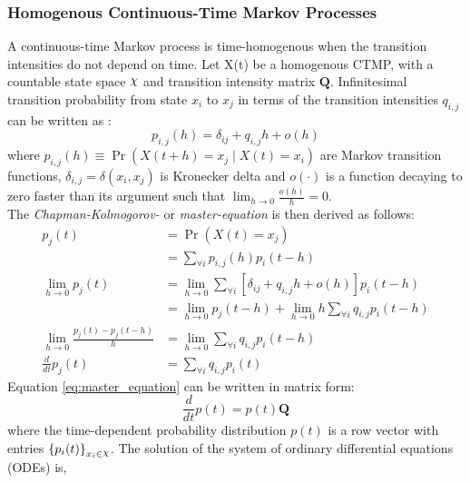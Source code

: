 \subsubsection{Homogenous Continuous-Time Markov Processes}
A continuous-time Markov process is time-homogenous when the transition intensities do not depend on time. Let X(t) be a homogenous CTMP, with a countable state space $ \rchi $ and transition intensity matrix $ \textbf{Q} $. Infinitesimal transition probability from state $ x_{i} $ to $ x_{j} $ in terms of the transition intensities $ q_{i,j} $ can be written as \cite{Cohn2010a}:
\begin{equation}
p_{i,j}(h)=\delta_{ij}+q_{i,j} h+o(h)
\label{eq:Markov_trans_func}
\end{equation}
where $ p_{i, j}(h) \equiv \operatorname{Pr}(X(t+h)=x_j\mid X(t)=x_i) $ are Markov transition functions, $ \delta_{i,j} = \delta(x_i,x_j)$ is Kronecker delta and $ o(\cdot) $ is a function decaying to zero faster than its argument such that $ \lim_{h \to 0} \frac{o(h)}{h} = 0 $.\\
The \textit{Chapman-Kolmogorov-} or \textit{master-equation} is then derived as follows:
\begin{align}
	p_{j}(t) &= \operatorname{Pr}(X(t) = x_{j}) \nonumber\\
		& =\sum_{\forall i} p_{i, j}(h) p_{i}(t-h) \nonumber \\
	\lim_{h\rightarrow 0} p_{j}(t) 
		& = \lim_{h\rightarrow 0} \sum_{\forall i} \left[ \delta_{ij}+q_{i,j} h+o(h)\right]  p_{i}(t-h) \nonumber \\ 
		& = \lim_{h\rightarrow 0} p_{j}(t-h) + \lim_{h\rightarrow 0} h \sum_{\forall i} q_{i,j} p_{i}(t-h) \nonumber \\
	\lim_{h\rightarrow 0} \frac{p_{j}(t) - p_{j}(t-h)}{h} 
		&= \lim_{h\rightarrow 0} \sum_{\forall i} q_{i,j} p_{i}(t-h) \nonumber\\
	\frac{d}{dt} p_{j}(t) & = \sum_{\forall i} q_{i,j} p_{i}(t)
	\label{eq:master_equation}
\end{align}
Equation \ref{eq:master_equation} can be written in matrix form:
\begin{equation}
\frac{d}{dt} p(t) = p(t)\textbf{Q}
\end{equation}
where the time-dependent probability distribution $ p(t) $ is a row vector with entries $ \left\lbrace p_{i}(t)\right\rbrace_{x_{i}\in \rchi} $. The solution of the system of ordinary differential equations (ODEs) is, 
